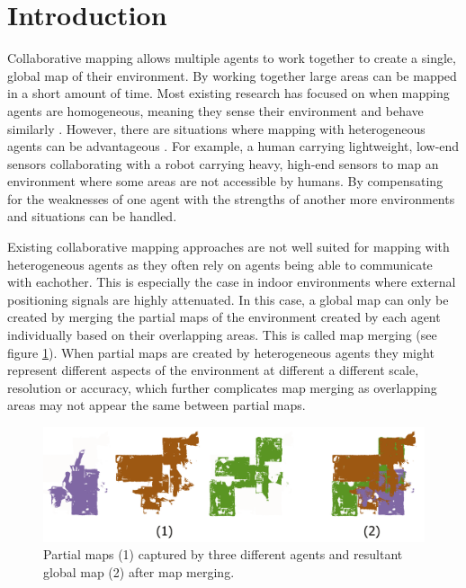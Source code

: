 
\section{Introduction}
Collaborative mapping allows multiple agents to work together to create a single, global map of their environment. By working together large areas can be mapped in a short amount of time. Most existing research has focused on when mapping agents are homogeneous, meaning they sense their environment and behave similarly \citep{andersone_heterogeneous_2019}. However, there are situations where mapping with heterogeneous agents can be advantageous \citep{hermann_design_2016}. For example, a human carrying lightweight, low-end sensors collaborating with a robot carrying heavy, high-end sensors to map an environment where some areas are not accessible by humans. By compensating for the weaknesses of one agent with the strengths of another more environments and situations can be handled. 

Existing collaborative mapping approaches are not well suited for mapping with heterogeneous agents as they often rely on agents being able to communicate with eachother. This is especially the case in indoor environments where external positioning signals are highly attenuated. In this case, a global map can only be created by merging the partial maps of the environment created by each agent individually based on their overlapping areas. This is called map merging (see figure \ref{fig:map_merging}). When partial maps are created by heterogeneous agents they might represent different aspects of the environment at different a different scale, resolution or accuracy, which further complicates map merging as overlapping areas may not appear the same between partial maps.

\begin{figure}[h]
    \centering
    \includegraphics*[width=\textwidth]{./fig/map_merging.png}
    \caption{Partial maps (1) captured by three different agents and resultant global map (2) after map merging.}
    \label{fig:map_merging}
\end{figure}

